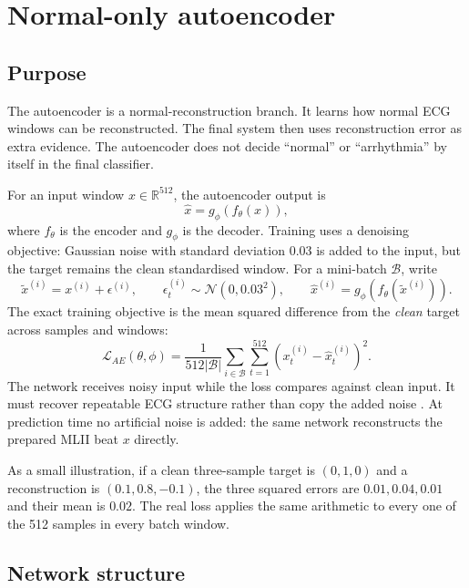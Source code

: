 \section{Normal-only autoencoder}

\subsection{Purpose}

The autoencoder is a normal-reconstruction branch. It learns how normal ECG
windows can be reconstructed. The final system then uses reconstruction error
as extra evidence. The autoencoder does not decide ``normal'' or
``arrhythmia'' by itself in the final classifier.

For an input window $x\in\mathbb{R}^{512}$, the autoencoder output is
\begin{equation}
 \widehat x=g_{\phi}(f_{\theta}(x)),
\end{equation}
where $f_{\theta}$ is the encoder and $g_{\phi}$ is the decoder. Training uses
a denoising objective: Gaussian noise with standard deviation 0.03 is added to
the input, but the target remains the clean standardised window. For a
mini-batch $\mathcal{B}$, write
\begin{equation}
 \widetilde x^{(i)}=x^{(i)}+\epsilon^{(i)},\qquad
 \epsilon_t^{(i)}\sim\mathcal{N}(0,0.03^2),\qquad
 \widehat x^{(i)}=g_{\phi}(f_{\theta}(\widetilde x^{(i)})).
\end{equation}
The exact training objective is the mean squared difference from the
\emph{clean} target across samples and windows:
\begin{equation}
 \mathcal{L}_{AE}(\theta,\phi)=
 \frac{1}{512|\mathcal{B}|}
 \sum_{i\in\mathcal{B}}\sum_{t=1}^{512}
 (x^{(i)}_t-\widehat x^{(i)}_t)^2.
 \label{eq:ae-loss-final}
\end{equation}
The network receives noisy input while the loss compares against clean input.
It must recover repeatable ECG structure rather than copy the added noise
\cite{vincent2008denoising}. At prediction time no artificial noise is added:
the same network reconstructs the prepared MLII beat $x$ directly.

As a small illustration, if a clean three-sample target is $(0,1,0)$ and a
reconstruction is $(0.1,0.8,-0.1)$, the three squared errors are
$0.01,0.04,0.01$ and their mean is $0.02$. The real loss applies the same
arithmetic to every one of the 512 samples in every batch window.

\subsection{Network structure}

